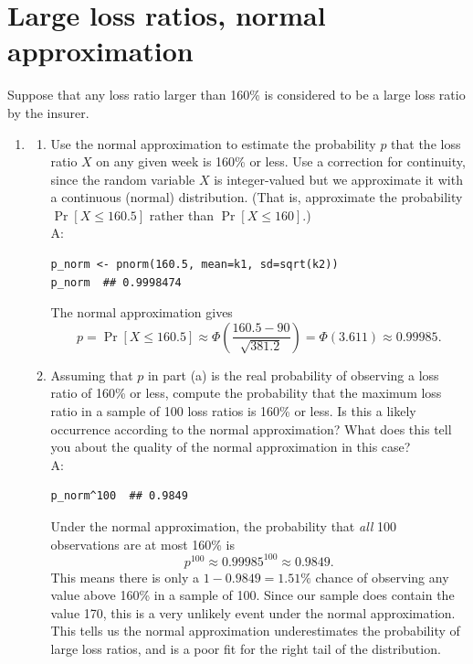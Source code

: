 \documentclass{article}
\begin{document}
\section{Large loss ratios, normal approximation}
Suppose that any loss ratio larger than 160\% is considered to be a large loss ratio by the insurer.
\begin{enumerate}
  \item[$\boldsymbol{Q_2}$]
    \begin{enumerate}
      \item[(a)] Use the normal approximation to estimate the probability $p$ that the loss ratio $X$ on any given week is 160\% or less. Use a correction for continuity, since the random variable $X$ is integer-valued but we approximate it with a continuous (normal) distribution. (That is, approximate the probability $\Pr[X \leq 160.5]$ rather than $\Pr[X \leq 160]$.)\\ A:

\begin{lstlisting}
p_norm <- pnorm(160.5, mean=k1, sd=sqrt(k2))
p_norm  ## 0.9998474
\end{lstlisting}

      The normal approximation gives
      \[
        p = \Pr[X \leq 160.5] \approx \Phi\!\left(\frac{160.5 - 90}{\sqrt{381.2}}\right) = \Phi(3.611) \approx 0.99985.
      \]

      \item[(b)] Assuming that $p$ in part (a) is the real probability of observing a loss ratio of 160\% or less, compute the probability that the maximum loss ratio in a sample of 100 loss ratios is 160\% or less. Is this a likely occurrence according to the normal approximation? What does this tell you about the quality of the normal approximation in this case?\\ A:

\begin{lstlisting}
p_norm^100  ## 0.9849
\end{lstlisting}

      Under the normal approximation, the probability that \textit{all} 100 observations are at most 160\% is
      \[
        p^{100} \approx 0.99985^{100} \approx 0.9849.
      \]
      This means there is only a $1 - 0.9849 = 1.51\%$ chance of observing any value above 160\% in a sample of 100. Since our sample does contain the value 170, this is a very unlikely event under the normal approximation. This tells us the normal approximation underestimates the probability of large loss ratios, and is a poor fit for the right tail of the distribution.
    \end{enumerate}
\end{enumerate}
\end{document}
